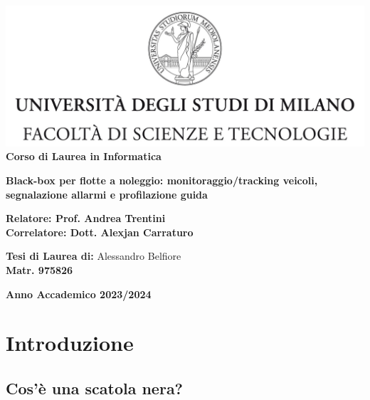\documentclass[12pt,a4paper]{report}
\begin{document}
\begin{titlepage}
\begin{center}
\includegraphics[width=\textwidth]{Logo.jpg}\\
{\large{\bf Corso di Laurea in Informatica}}
\end{center}
\vspace{12mm}
\begin{center}
{\huge{\bf Black-box per flotte a noleggio: monitoraggio/tracking veicoli, segnalazione allarmi e profilazione guida}}\\
\end{center}
\vspace{12mm}
\begin{flushleft}
{\large{\bf Relatore: Prof. Andrea Trentini}}
{\large{}}\\
\vspace{4mm}
{\large{\bf Correlatore: Dott. Alexjan Carraturo}}
{\large{}}\\
\end{flushleft}
\vspace{12mm}
\begin{flushright}
{\large{\bf Tesi di Laurea di:}}
{\large{Alessandro Belfiore}}\\
{\large{\bf Matr. 975826}}\\
\end{flushright}
\vspace{4mm}
\begin{center}
{\large{\bf Anno Accademico 2023/2024}}
\end{center}
\end{titlepage}


\tableofcontents


\chapter{Introduzione}
\section{Cos'è una scatola nera?}
\end{document}
